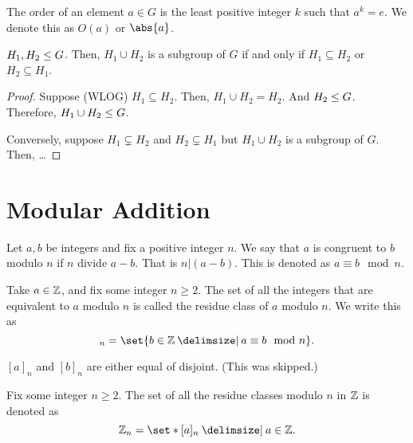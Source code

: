 \documentclass[11pt]{penrose}
\begin{document}
\begin{ndfn}
    The order of an element $a \in G$ is the least positive integer $k$ such that $a^k = e$. We denote this as $O(a)$ or $\abs{a}$.
\end{ndfn}

\begin{nthm}
    $H_1, H_2 \mathrel{\leq} G$. Then, $H_1 \cup H_2$ is a subgroup of $G$ if and only if $H_1 \subseteq H_2$ or $H_2 \subseteq H_1$.
\end{nthm}
\begin{proof}
    Suppose (WLOG) $H_1 \subseteq H_2$. Then, $H_1 \cup H_2 = H_2$. And $H_2 \mathrel{\leq} G$. Therefore, $H_1 \cup H_2 \mathrel{\leq} G$.

    Conversely, suppose $H_1 \subsetneq H_2$ and $H_2 \subsetneq H_1$ but $H_1 \cup H_2$ is a subgroup of $G$. Then, \dots
\end{proof}

\section{Modular Addition}

\begin{ndfn}
    Let $a, b$ be integers and fix a positive integer $n$. We say that $a$ is congruent to $b$ modulo $n$ if $n$ divide $a-b$. That is $n | (a-b)$. This is denoted as $a \equiv b \mod n$.
\end{ndfn}

\begin{ndfn}
    Take $a \in \mathbb{Z}$, and fix some integer $n \geq 2$. The set of all the integers that are equivalent to $a$ modulo $n$ is called the residue class of $a$ modulo $n$. We write this as
    \begin{equation*}
        [a]_n = \set{b \in \Z \st a \equiv b \mod n}.
    \end{equation*}
\end{ndfn}

\begin{remark}
    $[a]_n$ and $[b]_n$ are either equal of disjoint. (This was skipped.)
\end{remark}

\begin{ndfn}
    Fix some integer $n \geq 2$. The set of all the residue classes modulo $n$ in $\mathbb{Z}$ is denoted as
    \begin{equation*}
        \Z_n = \set*{[a]_n \st a \in \Z}.
    \end{equation*}
\end{ndfn}
\end{document}
